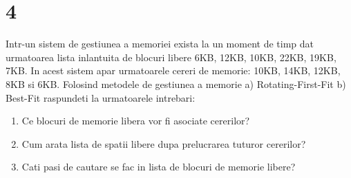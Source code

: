 \documentclass[11pt]{article}
\begin{document}
\section{4}
\label{sec:org22d58a3}
Intr-un sistem de gestiunea a memoriei exista la un moment de timp dat urmatoarea lista inlantuita de blocuri libere 6KB, 12KB, 10KB, 22KB, 19KB, 7KB. In acest sistem apar urmatoarele cereri de memorie: 10KB, 14KB, 12KB, 8KB si 6KB. Folosind metodele de gestiunea a memorie a) Rotating-First-Fit b) Best-Fit raspundeti la urmatoarele intrebari:

\begin{enumerate}
\item Ce blocuri de memorie libera vor fi asociate cererilor?

\item Cum arata lista de spatii libere dupa prelucrarea tuturor cererilor?

\item Cati pasi de cautare se fac in lista de blocuri de memorie libere?
\end{enumerate}
\end{document}
